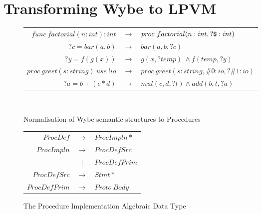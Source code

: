 \chapter{Transforming Wybe to LPVM}
\label{chap:wybe_to_lpvm}

\begin{figure}
  \centering
  \begin{tabular}{r c l}

    \( func\ factorial(n:int):int \) & \(\rightarrow \) & 
                                                          \( proc\ factorial(n:int, ?\verb+$+:int) \) \\
    \( ?c = bar(a, b) \) & \(\rightarrow\) & \( bar(a, b, ?c) \) \\
    \( ?y = f(g(x)) \) & \(\rightarrow\) & \( g(x, ?temp)\ \wedge f(temp, ?y) \) \\
    \( proc\ greet(s:string)\ use\ !io \) & \(\rightarrow\) &
                                                           \( proc\
                                                           greet(s:string,
                                                           \#0:io, ?\#1:io) \)
    \\
    \(?a = b + (c * d)\) & \(\rightarrow\) & \(mul(c,d,?t) \wedge add(b,t,?a) \) \\


  \end{tabular}
  \\
  \caption{Normalisation of Wybe semantic structures to Procedures}
  \label{fig:wybe_convert_to_proc}
\end{figure}



\begin{figure}
  \centering
  \begin{tabular}{r c l}
    \( ProcDef \)     & \( \rightarrow \) & \( ProcImpln* \)   \\
    \( ProcImpln \)   & \( \rightarrow \) & \( ProcDefSrc \)   \\
                      & \( \rvert \)        & \( ProcDefPrim \)  \\
    \( ProcDefSrc \)  & \( \rightarrow \) & \( Stmt* \)        \\
    \( ProcDefPrim \) & \( \rightarrow \) & \( Proto\ Body \)  \\
  \end{tabular}
  \caption{The Procedure Implementation Algebraic Data Type}
  \label{fig:proc_impln}
\end{figure}



